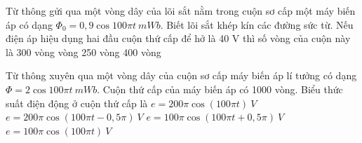 \begin{vidu} %
	Từ thông gửi qua một vòng dây của lõi sắt nằm trong cuộn sơ cấp một máy biến áp có dạng $\Phi_0=0,9\cos 100\pi t\ mWb$. Biết lõi sắt khép kín các đường sức từ. Nếu điện áp hiệu dụng hai đầu cuộn thứ cấp để hở là 40 V thì số vòng của cuộn này là
	\choice
	{300 vòng}
	{ vòng}
	{250 vòng}
	{400 vòng}
\end{vidu}
\begin{vidu} %
	Từ thông xuyên qua một vòng dây của cuộn sơ cấp máy biến áp lí tưởng có dạng $\Phi =2\cos 100\pi t\ mWb$. Cuộn thứ cấp của máy biến áp có 1000 vòng. Biểu thức suất điện động ở cuộn thứ cấp là
	\choice
	{$e=200\pi \cos \left( 100\pi t \right)\ V$}
	{\True $e=200\pi \cos \left( 100\pi t-0,5\pi
		\right)\ V$}
	{$e=100\pi \cos \left( 100\pi t+0,5\pi
		\right)\ V$}
	{$e=100\pi \cos \left( 100\pi t \right)\ V$}
\end{vidu}
